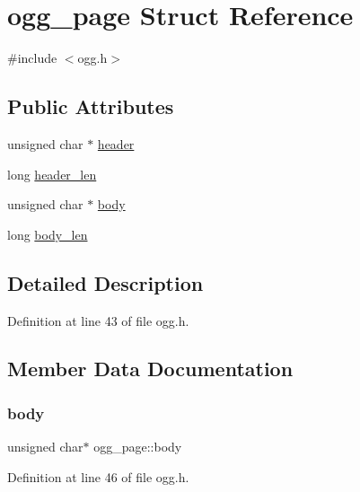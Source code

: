 \hypertarget{structogg__page}{}\section{ogg\+\_\+page Struct Reference}
\label{structogg__page}


{\ttfamily \#include $<$ogg.\+h$>$}

\subsection*{Public Attributes}
\begin{DoxyCompactItemize}
\item 
unsigned char $\ast$ \mbox{\hyperlink{structogg__page_a9f251dc1a96fbfd84ff2585fbbc03c16}{header}}
\item 
long \mbox{\hyperlink{structogg__page_aeaa6edc2ff9f2c5cc8f0ecf001936b7b}{header\+\_\+len}}
\item 
unsigned char $\ast$ \mbox{\hyperlink{structogg__page_af2fdee76f20ac267c6233f1d5f8afd30}{body}}
\item 
long \mbox{\hyperlink{structogg__page_ac6e649f0001899b512935448a903abac}{body\+\_\+len}}
\end{DoxyCompactItemize}


\subsection{Detailed Description}


Definition at line 43 of file ogg.\+h.



\subsection{Member Data Documentation}
\mbox{\label{structogg__page_af2fdee76f20ac267c6233f1d5f8afd30}} 
\subsubsection{\texorpdfstring{body}{body}}
{\footnotesize\ttfamily unsigned char$\ast$ ogg\+\_\+page\+::body}



Definition at line 46 of file ogg.\+h.

\mbox{\label{structogg__page_ac6e649f0001899b512935448a903abac}} 
